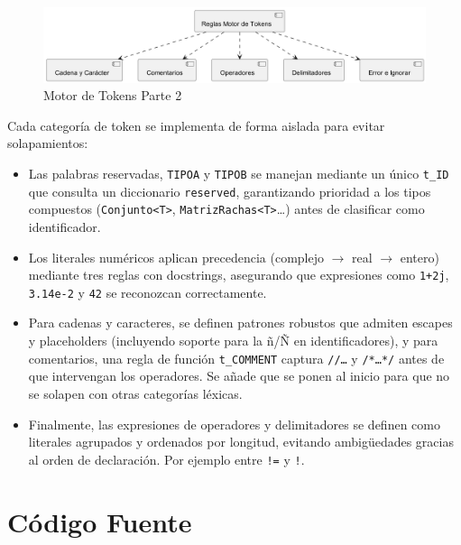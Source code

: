 \documentclass{article}
\begin{document}
\begin{figure}[ht]
  \centering
  \includegraphics[width=1\textwidth]{MotorTokens2.png}
  \caption{Motor de Tokens Parte 2}
  \label{fig:MotorTokens2}
\end{figure}


\noindent Cada categoría de token se implementa de forma aislada para evitar 
solapamientos:
\begin{itemize}
  \item Las palabras reservadas, \texttt{TIPOA} y \texttt{TIPOB}
      se manejan mediante un único \texttt{t\_ID} que consulta un diccionario 
      \texttt{reserved}, garantizando prioridad a los tipos compuestos 
      (\texttt{Conjunto<T>}, \texttt{MatrizRachas<T>}\dots) antes de clasificar 
      como identificador.
  \item Los literales numéricos aplican precedencia 
      (complejo \(\rightarrow\) real \(\rightarrow\) entero) mediante tres reglas 
        con docstrings, asegurando que expresiones 
        como \texttt{1+2j}, \texttt{3.14e-2} y \texttt{42} se reconozcan correctamente.
  \item Para cadenas y caracteres, se definen patrones robustos 
    que admiten escapes y placeholders (incluyendo soporte para la ñ/Ñ 
    en identificadores), y para comentarios, una regla de función 
    \texttt{t\_COMMENT} captura \texttt{//…} y \texttt{/*…*/} antes de que 
    intervengan los operadores. Se añade que se ponen al inicio para que no 
    se solapen con otras categorías léxicas.
  \item Finalmente, las expresiones de operadores y delimitadores se 
    definen como literales agrupados y ordenados por longitud, 
    evitando ambigüedades gracias al orden de declaración. Por
    ejemplo entre \texttt{!=} y \texttt{!}.
\end{itemize}



\section{Código Fuente}\label{sec:cod}
\end{document}
